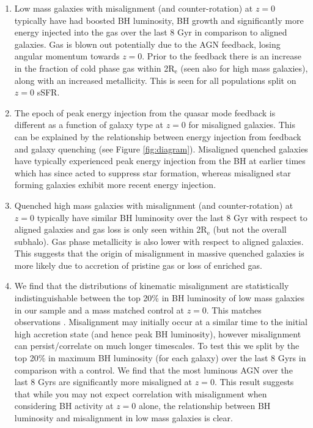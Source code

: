 \documentclass[fleqn,usenatbib]{mnras}
\begin{document}
\begin{enumerate}
    \item Low mass galaxies with misalignment (and counter-rotation) at $z=0$ typically have had boosted BH luminosity, BH growth and significantly more energy injected into the gas over the last 8 Gyr in comparison to aligned galaxies. Gas is blown out potentially due to the AGN feedback, losing angular momentum towards $z=0$. Prior to the feedback there is an increase in the fraction of cold phase gas within 2$\mathrm{R_{e}}$ (seen also for high mass galaxies), along with an increased metallicity. This is seen for all populations split on $z=0$ sSFR.
    
    \item The epoch of peak energy injection from the quasar mode feedback is different as a function of galaxy type at $z=0$ for misaligned galaxies. This can be explained by the relationship between energy injection from feedback and galaxy quenching (see Figure \ref{fig:diagram}). Misaligned quenched galaxies have typically experienced peak energy injection from the BH at earlier times which has since acted to suppress star formation, whereas misaligned star forming galaxies exhibit more recent energy injection. 

    \item Quenched high mass galaxies with misalignment (and counter-rotation) at $z=0$ typically have similar BH luminosity over the last 8 Gyr with respect to aligned galaxies and gas loss is only seen within 2$\mathrm{R_{e}}$ (but not the overall subhalo). Gas phase metallicity is also lower with respect to aligned galaxies. This suggests that the origin of misalignment in massive quenched galaxies is more likely due to accretion of pristine gas or loss of enriched gas. 
    
    \item We find that the distributions of kinematic misalignment are statistically indistinguishable between the top 20\% in BH luminosity of low mass galaxies in our sample and a mass matched control at $z=0$. This matches observations \citep[see Figure 6 in][]{ilha2019}. Misalignment may initially occur at a similar time to the initial high accretion state (and hence peak BH luminosity), however misalignment can persist/correlate on much longer timescales. To test this we split by the top 20\% in maximum BH luminosity (for each galaxy) over the last 8 Gyrs in comparison with a control. We find that the most luminous AGN over the last 8 Gyrs are significantly more misaligned at $z=0$. This result suggests that while you may not expect correlation with misalignment when considering BH activity at $z=0$ alone, the relationship between BH luminosity and misalignment in low mass galaxies is clear. 
\end{enumerate}
\end{document}
